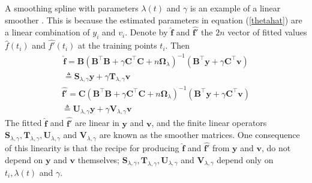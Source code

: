 A smoothing spline with parameters $\lambda(t)$ and $\gamma$ is an example of a linear smoother \cite{esl2009}. This is because the estimated parameters in equation (\ref{thetahat}) are a linear combination of $y_i$ and $v_i$. Denote by $\hat{\mathbf{f}}$ and $\hat{\mathbf{f}'}$ the $2n$ vector of fitted values $\hat{f}(t_i)$ and $\hat{f'}(t_i)$ at the training points $t_i$. Then
\begin{equation}
\begin{split}
\hat{\mathbf{f}} =\mathbf{B}(\mathbf{B}^\top\mathbf{B}+\gamma\mathbf{C}^\top\mathbf{C}+n\mathbf{\Omega}_{\lambda})^{-1}(\mathbf{B}^\top\mathbf{y}+\gamma\mathbf{C}^\top\mathbf{v})\\
\triangleq \mathbf{S}_{\lambda,\gamma}\mathbf{y}+\gamma\mathbf{T}_{\lambda,\gamma}\mathbf{v} 
\end{split}
\end{equation}
\begin{equation}
\begin{split}
\hat{\mathbf{f}'}
=\mathbf{C}(\mathbf{B}^\top\mathbf{B}+\gamma\mathbf{C}^\top\mathbf{C}+n\mathbf{\Omega}_{\lambda})^{-1}(\mathbf{B}^\top\mathbf{y}+\gamma\mathbf{C}^\top\mathbf{v})\\
\triangleq\mathbf{U}_{\lambda,\gamma}\mathbf{y}+\gamma\mathbf{V}_{\lambda,\gamma}\mathbf{v}
\end{split}
\end{equation}
The fitted $\hat{\mathbf{f}}$ and $\hat{\mathbf{f}'}$ are linear in $\mathbf{y}$ and $\mathbf{v}$, and the finite linear operators $\mathbf{S}_{\lambda,\gamma}, \mathbf{T}_{\lambda,\gamma}, \mathbf{U}_{\lambda,\gamma}$ and $\mathbf{V}_{\lambda,\gamma}$ are known as the smoother matrices. One consequence of this linearity is that the recipe for producing $\hat{\mathbf{f}}$ and $\hat{\mathbf{f}'}$ from $\mathbf{y}$ and $\mathbf{v}$, do not depend on $\mathbf{y}$ and $\mathbf{v}$ themselves; $\mathbf{S}_{\lambda,\gamma}, \mathbf{T}_{\lambda,\gamma}, \mathbf{U}_{\lambda,\gamma}$ and $\mathbf{V}_{\lambda,\gamma}$ depend only on $t_i,\lambda(t)$ and $\gamma$.

